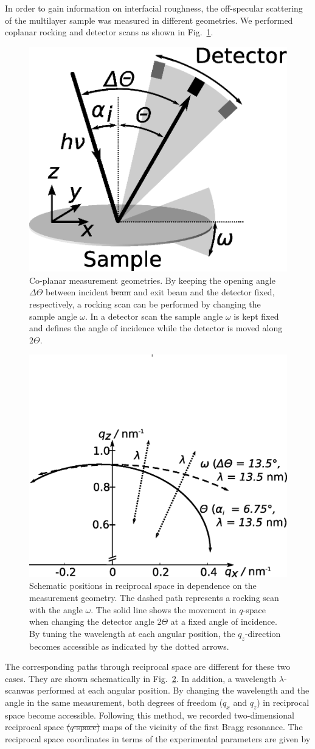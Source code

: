 \documentclass[twocolumn,osajnl,showpacs,superscriptaddress,11pt]{revtex4-1}
\providecommand{\DIFadd}[1]{{\protect\color{blue}\uwave{#1}}} %
\providecommand{\DIFdel}[1]{{\protect\color{red}\sout{#1}}}                      %
\providecommand{\DIFaddbegin}{} %
\providecommand{\DIFaddend}{} %
\providecommand{\DIFdelbegin}{} %
\providecommand{\DIFdelend}{} %
\providecommand{\DIFaddFL}[1]{\DIFadd{#1}} %
\providecommand{\DIFdelFL}[1]{\DIFdel{#1}} %
\providecommand{\DIFaddbeginFL}{} %
\providecommand{\DIFaddendFL}{} %
\providecommand{\DIFdelbeginFL}{} %
\providecommand{\DIFdelendFL}{} %
\begin{document}
In order to gain information on interfacial roughness, the off-specular scattering of the multilayer sample was measured in different geometries. We performed coplanar rocking and detector scans as shown in Fig.~\ref{fig:measurementGeometry}.
\begin{figure}
	\includegraphics[width=0.3
	\textwidth]{Streugeometrie} \caption{Co-planar measurement geometries. By keeping the opening angle $\Delta\Theta$ between incident \DIFdelbeginFL \DIFdelFL{beam }\DIFdelendFL and exit beam and the detector fixed, respectively, a rocking scan can be performed by changing the sample angle $\omega$. In a detector scan the sample angle $\omega$ is kept fixed and defines the angle of incidence while the detector is moved along \DIFdelbeginFL \DIFdelFL{$2\Theta$}\DIFdelendFL \DIFaddbeginFL \DIFaddFL{$\Theta$}\DIFaddendFL .} \label{fig:measurementGeometry} 
\end{figure}
\begin{figure}
	\includegraphics[width=0.45
	\textwidth]{Qspace_paths} \caption{Schematic positions in reciprocal space in dependence on the measurement geometry. The dashed path represents a rocking scan with the angle $\omega$. The solid line shows the movement in $q$-space when changing the detector angle \DIFdelbeginFL \DIFdelFL{$2\Theta$ }\DIFdelendFL \DIFaddbeginFL \DIFaddFL{$\Theta$ }\DIFaddendFL at a fixed angle of incidence. By tuning the wavelength at each angular position, the $q_z$-direction becomes accessible as indicated by the dotted arrows.} \label{fig:pathsInQ} 
\end{figure}
The corresponding paths through reciprocal space are different for these two cases. They are shown schematically in Fig.~\ref{fig:pathsInQ}. In addition, a wavelength \DIFaddbegin \DIFadd{scan (}\DIFaddend $\lambda$-scan\DIFaddbegin \DIFadd{) }\DIFaddend was performed at each angular position. By changing the wavelength and the angle in the same measurement, both degrees of freedom ($q_x$ and $q_z$) in reciprocal space become accessible. Following this method, we recorded two-dimensional reciprocal space \DIFdelbegin \DIFdel{($q$-space) }\DIFdelend maps of the vicinity of the first Bragg resonance. The reciprocal space coordinates in terms of the experimental parameters are given by 
\end{document}
